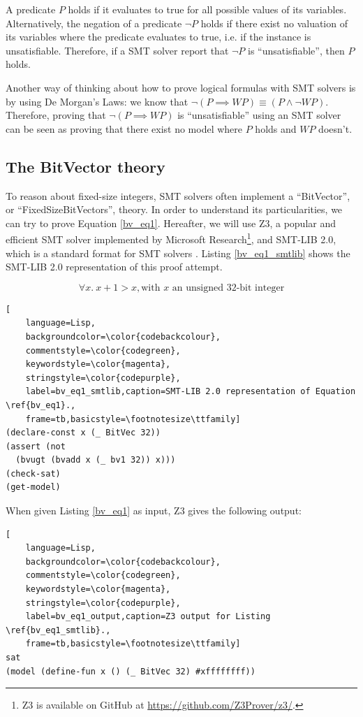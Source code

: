 \documentclass{kththesis}
\newcommand{\WP}{\ensuremath{\mathit{WP}}}
\begin{document}
{A predicate $P$ holds if it evaluates to true for all possible values of its variables. Alternatively, the negation of a predicate $\neg P$ holds if there exist no valuation of its variables where the predicate evaluates to true, i.e. if the instance is unsatisfiable. Therefore, if a {SMT} solver report that $\neg P$ is ``unsatisfiable'', then $P$ holds.

Another way of thinking about how to prove logical formulas with {SMT} solvers is by using De Morgan's Laws: we know that $\neg (P \implies \WP) \equiv (P \land \neg \WP)$. Therefore, proving that $\neg (P \implies \WP)$ is ``unsatisfiable'' using an {SMT} solver can be seen as proving that there exist no model where $P$ holds and $\WP$ doesn't.

\subsection{The BitVector theory}

To reason about fixed-size integers, \gls{SMT} solvers often implement a ``BitVector'', or ``FixedSizeBitVectors'', theory. In order to understand its particularities, we can try to prove Equation \ref{bv_eq1}. Hereafter, we will use Z3, a popular and efficient {SMT} solver implemented by Microsoft Research\footnote{Z3 is available on GitHub at \url{https://github.com/Z3Prover/z3/}.}, and SMT-LIB 2.0, which is a standard format for {SMT} solvers \cite{barrett_satisfiability_2016}. Listing \ref{bv_eq1_smtlib} shows the SMT-LIB 2.0 representation of this proof attempt.

\begin{equation}
    \forall x.~ x + 1 > x, \text{with $x$ an unsigned 32-bit integer}
    \label{bv_eq1}
\end{equation}

\begin{lstlisting}[
    language=Lisp,
    backgroundcolor=\color{codebackcolour},
    commentstyle=\color{codegreen},
    keywordstyle=\color{magenta},
    stringstyle=\color{codepurple},
    label=bv_eq1_smtlib,caption=SMT-LIB 2.0 representation of Equation \ref{bv_eq1}.,
    frame=tb,basicstyle=\footnotesize\ttfamily]
(declare-const x (_ BitVec 32))
(assert (not
  (bvugt (bvadd x (_ bv1 32)) x)))
(check-sat)
(get-model)
\end{lstlisting}

When given Listing \ref{bv_eq1} as input, Z3 gives the following output:

\begin{lstlisting}[
    language=Lisp,
    backgroundcolor=\color{codebackcolour},
    commentstyle=\color{codegreen},
    keywordstyle=\color{magenta},
    stringstyle=\color{codepurple},
    label=bv_eq1_output,caption=Z3 output for Listing \ref{bv_eq1_smtlib}.,
    frame=tb,basicstyle=\footnotesize\ttfamily]
sat
(model (define-fun x () (_ BitVec 32) #xffffffff))
\end{lstlisting}

}
\end{document}
